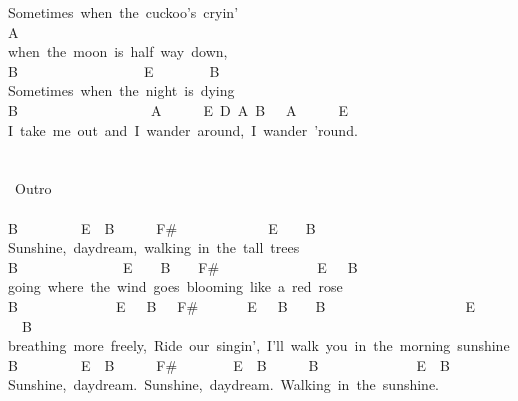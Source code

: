 {Sometimes\ when\ the\ cuckoo's\ cryin'\\
A\ \ \ \ \ \ \ \ \\
when\ the\ moon\ is\ half\ way\ down,\\
B\ \ \ \ \ \ \ \ \ \ \ \ \ \ \ \ \ \ E\ \ \ \ \ \ \ \ B\\
Sometimes\ when\ the\ night\ is\ dying\\
B\ \ \ \ \ \ \ \ \ \ \ \ \ \ \ \ \ \ \ A\ \ \ \ \ \ E\ D\ A\ B\ \ \ A\ \ \ \ \ \ E\ \\
I\ take\ me\ out\ and\ I\ wander\ around,\ I\ wander\ 'round.\\
\\
\\
\lbrack\ Outro\rbrack\\
\\
B\ \ \ \ \ \ \ \ \ E\ \ B\ \ \ \ \ \ F\#\ \ \ \ \ \ \ \ \ \ \ \ \ E\ \ \ \ B\\
Sunshine,\ daydream,\ walking\ in\ the\ tall\ trees\\
B\ \ \ \ \ \ \ \ \ \ \ \ \ \ \ E\ \ \ \ B\ \ \ \ F\#\ \ \ \ \ \ \ \ \ \ \ \ \ \ E\ \ \ B\\
going\ where\ the\ wind\ goes\ blooming\ like\ a\ red\ rose\\
B\ \ \ \ \ \ \ \ \ \ \ \ \ \ E\ \ \ B\ \ \ F\#\ \ \ \ \ \ \ E\ \ \ B\ \ \ \ B\ \ \ \ \ \ \ \ \ \ \ \ \ \ \ \ \ \ \ \ E\ \ \ \ \ \ \ B\\
breathing\ more\ freely,\ Ride\ our\ singin',\ I'll\ walk\ you\ in\ the\ morning\ sunshine\\
B\ \ \ \ \ \ \ \ \ E\ \ B\ \ \ \ \ \ F\#\ \ \ \ \ \ \ \ E\ \ B\ \ \ \ \ \ B\ \ \ \ \ \ \ \ \ \ \ \ \ \ E\ \ B\\
Sunshine,\ daydream.\ Sunshine,\ daydream.\ Walking\ in\ the\ sunshine.}
